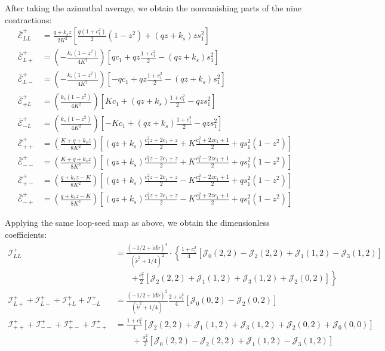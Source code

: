 \documentclass[a4paper,12pt]{article}
\def\J{\mathcal{J}}
\def\ii{\mathrm{i}}
\def\tn{\tilde\nu}
\begin{document}
After taking the azimuthal average, we obtain the nonvanishing parts of the nine contractions:
\begin{align}
    \bar{\mathcal{E}}^+_{LL} 
    &= \frac{q+k_s z}{2K^2}
    \left[
        \frac{q(1+c_1^2)}{2} (1-z^2) 
        + (qz+k_s)z s_1^2
    \right] \nonumber \\
    \bar{\mathcal{E}}^+_{L+}
    &= \left(-\frac{k_s(1-z^2)}{4K^2}\right)
    \left[
        qc_1 + qz\frac{1+c_1^2}{2} -(qz+k_s)s_1^2
    \right] \nonumber \\
    \bar{\mathcal{E}}^+_{L-}
    &= \left(-\frac{k_s(1-z^2)}{4K^2}\right)
    \left[
        -qc_1 + qz\frac{1+c_1^2}{2} -(qz+k_s)s_1^2
    \right] \nonumber \\
    \bar{\mathcal{E}}^+_{+L}
    &= \left(\frac{k_s(1-z^2)}{4K^2}\right)
    \left[
        Kc_1 + (qz+k_s)\frac{1+c_1^2}{2} -qz s_1^2
    \right] \nonumber \\
    \bar{\mathcal{E}}^+_{-L}
    &= \left(\frac{k_s(1-z^2)}{4K^2}\right)
    \left[
        -Kc_1 + (qz+k_s)\frac{1+c_1^2}{2} -qz s_1^2
    \right] \nonumber \\
    \bar{\mathcal{E}}^+_{++}
    &= \left(\frac{K+q+k_sz}{8K^2}\right)
    \left[
        (qz+k_s)\frac{c_1^2z+2c_1+z}{2} +K\frac{c_1^2+2zc_1+1}{2} + qs_1^2(1-z^2)
    \right] \nonumber \\
    \bar{\mathcal{E}}^+_{--}
    &= \left(\frac{K+q+k_sz}{8K^2}\right)
    \left[
        (qz+k_s)\frac{c_1^2z-2c_1+z}{2} +K\frac{c_1^2-2zc_1+1}{2} + qs_1^2(1-z^2)
    \right] \nonumber \\
    \bar{\mathcal{E}}^+_{+-}
    &= \left(\frac{q+k_sz-K}{8K^2}\right)
    \left[
        (qz+k_s)\frac{c_1^2z-2c_1+z}{2} -K\frac{c_1^2-2zc_1+1}{2} + qs_1^2(1-z^2)
    \right] \nonumber \\
    \bar{\mathcal{E}}^+_{-+}
    &= \left(\frac{q+k_sz-K}{8K^2}\right)
    \left[
        (qz+k_s)\frac{c_1^2z+2c_1+z}{2} -K\frac{c_1^2+2zc_1+1}{2} + qs_1^2(1-z^2)
    \right]
\end{align}

Applying the same loop-seed map as above, we obtain the dimensionless coefficients:
\begin{align}
    {\mathcal{I}}^+_{LL} 
    &= \frac{(-1/2 + \ii d \tn)^4}{(\tn^2+1/4)^2} 
    \cdot \left\{ \frac{1+c_1^2}{4} [ \mathcal{J}_0(2,2) -\mathcal{J}_2(2,2) +\mathcal{J}_1(1,2) -\mathcal{J}_3(1,2) ] \right. \nonumber \\
    &\qquad \left. +\frac{s_1^2}{2} [\mathcal{J}_2(2,2) +\mathcal{J}_1(1,2) +\mathcal{J}_3(1,2) +\mathcal{J}_2(0,2) ] \right\} \nonumber \\
    {\mathcal{I}}^+_{L+} + {\mathcal{I}}^+_{L-} 
    + {\mathcal{I}}^+_{+L} + {\mathcal{I}}^+_{-L} 
    &= \frac{(-1/2 + \ii d \tn)^2}{(\tn^2+1/4)}
    \frac{2+s_1^2}{4} [\mathcal{J}_0(0,2)-\mathcal{J}_2(0,2)] \nonumber \\
    {\mathcal{I}}^+_{++} + {\mathcal{I}}^+_{--} 
    + {\mathcal{I}}^+_{+-} + {\mathcal{I}}^+_{-+} 
    &= \frac{1+c_1^2}{4} [\mathcal{J}_2(2,2) +\mathcal{J}_1(1,2)
    +\J_3(1,2) +\J_2(0,2) +\J_0(0,0)] \nonumber \\
    &\qquad + \frac{s_1^2}{2} [\J_0(2,2) -\J_2(2,2) +\J_1(1,2) -\J_3(1,2)]     
\end{align}
\end{document}
